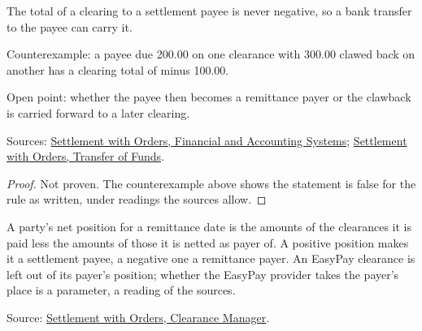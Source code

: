 \begin{theorem}
  \label{thm:accounting-clearing-nonneg}
  The total of a clearing to a settlement payee is never negative, so a
  bank transfer to the payee can carry it.

  Counterexample: a payee due 200.00 on one clearance with 300.00 clawed
  back on another has a clearing total of minus 100.00.

  Open point: whether the payee then becomes a remittance payer or the
  clawback is carried forward to a later clearing.

  Sources: \href{https://standards.atlassian.net/wiki/spaces/SWO/pages/574554300}{Settlement with Orders, Financial and Accounting Systems};
  \href{https://standards.atlassian.net/wiki/spaces/SWO/pages/574488849}{Settlement with Orders, Transfer of Funds}.
\end{theorem}
\begin{proof}
  Not proven.  The counterexample above shows the statement is false for
  the rule as written, under readings the sources allow.
\end{proof}

\begin{definition}
  \label{def:accounting-net-position}
  A party's net position for a remittance date is the amounts of the
  clearances it is paid less the amounts of those it is netted as payer of.
  A positive position makes it a settlement payee, a negative one a
  remittance payer.  An EasyPay clearance is left out of its payer's
  position; whether the EasyPay provider takes the payer's place is a
  parameter, a reading of the sources.

  Source: \href{https://standards.atlassian.net/wiki/spaces/SWO/pages/574259794}{Settlement with Orders, Clearance Manager}.
\end{definition}

